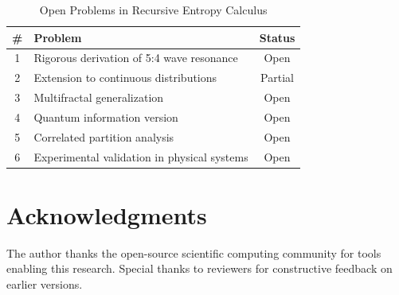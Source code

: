 \documentclass[11pt,a4paper]{article}
\theoremstyle{definition}
\theoremstyle{remark}
\begin{document}
\begin{table}[H]
\centering
\caption{Open Problems in Recursive Entropy Calculus}
\label{tab:open_problems}
\begin{tabular}{@{}clc@{}}
\toprule
\textbf{\#} & \textbf{Problem} & \textbf{Status} \\
\midrule
1 & Rigorous derivation of 5:4 wave resonance & Open \\
2 & Extension to continuous distributions & Partial \\
3 & Multifractal generalization & Open \\
4 & Quantum information version & Open \\
5 & Correlated partition analysis & Open \\
6 & Experimental validation in physical systems & Open \\
\bottomrule
\end{tabular}
\end{table}

\section*{Acknowledgments}

The author thanks the open-source scientific computing community for tools enabling this research. Special thanks to reviewers for constructive feedback on earlier versions.
\end{document}
